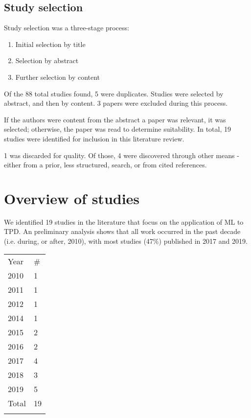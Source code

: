 \documentclass{article}
\begin{document}
\subsection{Study selection}

Study selection was a three-stage process:

\begin{enumerate}
	\item Initial selection by title
	\item Selection by abstract
	\item Further selection by content
\end{enumerate}

Of the 88 total studies found, 5 were duplicates. Studies were selected by abstract, and then by content. 3 papers were excluded during this process.

If the authors were content from the abstract a paper was relevant, it was selected; otherwise, the paper was read to determine suitability. In total, 19 studies were identified for inclusion in this literature review. 

1 was discarded for quality. 
Of those, 4 were discovered through other means - either from a prior, less structured, search, or from cited references.

\clearpage
\section{Overview of studies}

We identified 19 studies in the literature that focus on the application of ML to TPD. An preliminary analysis shows that all work occurred in the past decade (i.e. during, or after, 2010), with most studies (47\%) published in 2017 and 2019.

\begin{table}[h]
\centering
\begin{tabular}{ll}
\noalign{\smallskip}\hline \noalign{\smallskip}
Year  & \# \\	\noalign{\smallskip}\hline \noalign{\smallskip}
2010  & 1  \\
2011  & 1  \\
2012  & 1  \\
2014 & 1	\\
2015  & 2  \\
2016  & 2  \\
2017  & 4  \\
2018  & 3  \\
2019 & 5  \\ 	\noalign{\smallskip}
Total & 19 \\  \noalign{\smallskip}\hline
\end{tabular}
\end{table}
\end{document}
